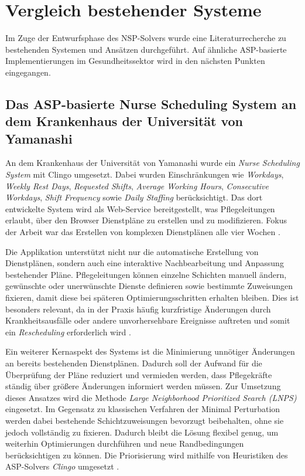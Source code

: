 \cleardoubleoddpage%
\chapter{Vergleich bestehender Systeme}
\label{sec:example}
Im Zuge der Entwurfsphase des NSP-Solvers wurde eine Literaturrecherche zu bestehenden 
Systemen und Ansätzen durchgeführt. Auf ähnliche ASP-basierte Implementierungen im Gesundheitssektor wird in den nächsten Punkten eingegangen.

\section{Das ASP-basierte Nurse Scheduling System an dem Krankenhaus der Universität von Yamanashi}
An dem Krankenhaus der Universität von Yamanashi wurde ein \textit{Nurse Scheduling System} mit Clingo umgesetzt. 
Dabei wurden Einschränkungen wie \textit{Workdays}, \textit{Weekly Rest Days}, \textit{Requested Shifts}, \textit{Average Working Hours}, \textit{Consecutive Workdays}, \textit{Shift Frequency} sowie \textit{Daily Staffing} berücksichtigt. Das dort entwickelte System wird als Web-Service bereitgestellt, was Pflegeleitungen erlaubt, über den Browser Dienstpläne zu erstellen und zu modifizieren. Fokus der Arbeit war das Erstellen von komplexen Dienstplänen alle vier Wochen \parencite{nabeshimaASPbasedNurseScheduling2026}.

Die Applikation unterstützt nicht nur die automatische Erstellung von Dienstplänen, sondern auch eine interaktive Nachbearbeitung und Anpassung bestehender Pläne. Pflegeleitungen können einzelne Schichten manuell ändern, gewünschte oder unerwünschte Dienste definieren sowie bestimmte Zuweisungen fixieren, damit diese bei späteren Optimierungsschritten erhalten bleiben. Dies ist besonders relevant, da in der Praxis häufig kurzfristige Änderungen durch Krankheitsausfälle oder andere unvorhersehbare Ereignisse auftreten und somit ein \textit{Rescheduling} erforderlich wird \parencite{nabeshimaASPbasedNurseScheduling2026}.

Ein weiterer Kernaspekt des Systems ist die Minimierung unnötiger Änderungen an bereits bestehenden Dienstplänen. Dadurch soll der Aufwand für die Überprüfung der Pläne reduziert und vermieden werden, dass Pflegekräfte ständig über größere Änderungen informiert werden müssen. Zur Umsetzung dieses Ansatzes wird die Methode \textit{Large Neighborhood Prioritized Search (LNPS)} eingesetzt. Im Gegensatz zu klassischen Verfahren der Minimal Perturbation werden dabei bestehende Schichtzuweisungen bevorzugt beibehalten, ohne sie jedoch vollständig zu fixieren. Dadurch bleibt die Lösung flexibel genug, um weiterhin Optimierungen durchführen und neue Randbedingungen berücksichtigen zu können. Die Priorisierung wird mithilfe von Heuristiken des ASP-Solvers \textit{Clingo} umgesetzt \parencite{nabeshimaASPbasedNurseScheduling2026}.

